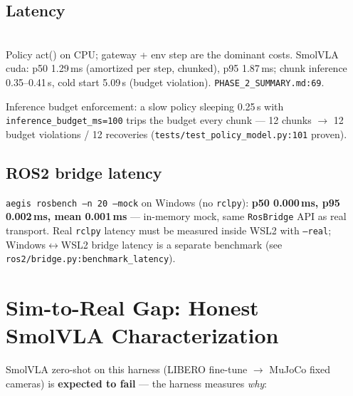 \documentclass[11pt,a4paper]{article}
\begin{document}
\subsection{Latency}
\begin{center}
\\[1mm]
{\scriptsize\textcolor{aegisgray}{Policy act() on CPU; gateway + env step are the dominant costs. SmolVLA cuda: p50 1.29\,ms (amortized per step, chunked), p95 1.87\,ms; chunk inference 0.35--0.41\,s, cold start 5.09\,s (budget violation). \texttt{PHASE\_2\_SUMMARY.md:69}.}}
\end{center}

Inference budget enforcement: a slow policy sleeping 0.25\,s with \texttt{inference\_budget\_ms=100} trips the budget every chunk — 12 chunks $\rightarrow$ 12 budget violations / 12 recoveries (\texttt{tests/test\_policy\_model.py:101} proven).

\subsection{ROS2 bridge latency}
\texttt{aegis rosbench --n 20 --mock} on Windows (no \texttt{rclpy}): \textbf{p50 0.000\,ms, p95 0.002\,ms, mean 0.001\,ms} — in-memory mock, same \texttt{RosBridge} API as real transport. Real \texttt{rclpy} latency must be measured inside WSL2 with \texttt{--real}; Windows$\leftrightarrow$WSL2 bridge latency is a separate benchmark (see \texttt{ros2/bridge.py:benchmark\_latency}).

\section{Sim-to-Real Gap: Honest SmolVLA Characterization}
SmolVLA zero-shot on this harness (LIBERO fine-tune $\rightarrow$ MuJoCo fixed cameras) is \textbf{expected to fail} — the harness measures \textit{why}:
\end{document}

